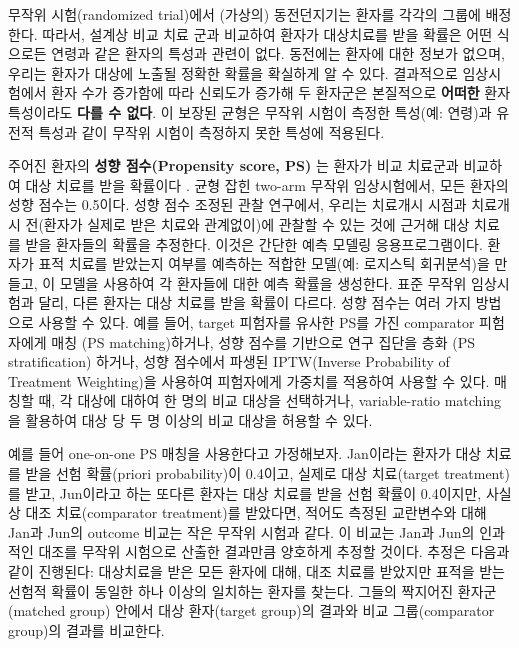 \documentclass[11pt]{book}
\theoremstyle{definition}
\theoremstyle{definition}
\theoremstyle{definition}
\theoremstyle{remark}
\begin{document}
무작위 시험(randomized trial)에서 (가상의) 동전던지기는 환자를 각각의
그룹에 배정한다. 따라서, 설계상 비교 치료 군과 비교하여 환자가
대상치료를 받을 확률은 어떤 식으로든 연령과 같은 환자의 특성과 관련이
없다. 동전에는 환자에 대한 정보가 없으며, 우리는 환자가 대상에 노출될
정확한 확률을 확실하게 알 수 있다. 결과적으로 임상시험에서 환자 수가
증가함에 따라 신뢰도가 증가해 두 환자군은 본질적으로 \textbf{어떠한}
환자 특성이라도 \textbf{다를 수 없다}. 이 보장된 균형은 무작위 시험이
측정한 특성(예: 연령)과 유전적 특성과 같이 무작위 시험이 측정하지 못한
특성에 적용된다. 

주어진 환자의 \textbf{성향 점수(Propensity score, PS)} 는 환자가 비교
치료군과 비교하여 대상 치료를 받을 확률이다 \citep{rosenbaum_1983}. 균형
잡힌 two-arm 무작위 임상시험에서, 모든 환자의 성향 점수는 0.5이다. 성향
점수 조정된 관찰 연구에서, 우리는 치료개시 시점과 치료개시 전(환자가
실제로 받은 치료와 관계없이)에 관찰할 수 있는 것에 근거해 대상 치료를
받을 환자들의 확률을 추정한다. 이것은 간단한 예측 모델링
응용프로그램이다. 환자가 표적 치료를 받았는지 여부를 예측하는 적합한
모델(예: 로지스틱 회귀분석)을 만들고, 이 모델을 사용하여 각 환자들에
대한 예측 확률을 생성한다. 표준 무작위 임상시험과 달리, 다른 환자는 대상
치료를 받을 확률이 다르다. 성향 점수는 여러 가지 방법으로 사용할 수
있다. 예를 들어, target 피험자를 유사한 PS를 가진 comparator 피험자에게
매칭 (PS matching)하거나, 성향 점수를 기반으로 연구 집단을 층화 (PS
stratification) 하거나, 성향 점수에서 파생된 IPTW(Inverse Probability of
Treatment Weighting)을 사용하여 피험자에게 가중치를 적용하여 사용할 수
있다. 매칭할 때, 각 대상에 대하여 한 명의 비교 대상을 선택하거나,
variable-ratio matching을 활용하여 대상 당 두 명 이상의 비교 대상을
허용할 수 있다. \citep{rassen_2012} 

예를 들어 one-on-one PS 매칭을 사용한다고 가정해보자. Jan이라는 환자가
대상 치료를 받을 선험 확률(priori probability)이 0.4이고, 실제로 대상
치료(target treatment)를 받고, Jun이라고 하는 또다른 환자는 대상 치료를
받을 선험 확률이 0.4이지만, 사실상 대조 치료(comparator treatment)를
받았다면, 적어도 측정된 교란변수와 대해 Jan과 Jun의 outcome 비교는 작은
무작위 시험과 같다. 이 비교는 Jan과 Jun의 인과적인 대조를 무작위
시험으로 산출한 결과만큼 양호하게 추정할 것이다. 추정은 다음과 같이
진행된다: 대상치료을 받은 모든 환자에 대해, 대조 치료를 받았지만 표적을
받는 선험적 확률이 동일한 하나 이상의 일치하는 환자를 찾는다. 그들의
짝지어진 환자군(matched group) 안에서 대상 환자(target group)의 결과와
비교 그룹(comparator group)의 결과를 비교한다.
\end{document}
